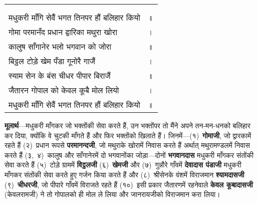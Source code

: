 
{
{\bfseries
\setlength{\mylenone}{0pt}
\settowidth{\mylentwo}{}
\setlength{\mylenone}{\maxof{\mylenone}{\mylentwo}}
\settowidth{\mylentwo}{मधुकरी माँगि सेवैं भगत तिनपर हौं बलिहार कियो}
\setlength{\mylenone}{\maxof{\mylenone}{\mylentwo}}
\settowidth{\mylentwo}{गोमा परमानँद प्रधान द्वारिका मथुरा खोरा}
\setlength{\mylenone}{\maxof{\mylenone}{\mylentwo}}
\settowidth{\mylentwo}{कालुष साँगानेर भलो भगवान को जोरा}
\setlength{\mylenone}{\maxof{\mylenone}{\mylentwo}}
\settowidth{\mylentwo}{बिट्ठल टोड़े खेम पँडा गूनोरै गाजैं}
\setlength{\mylenone}{\maxof{\mylenone}{\mylentwo}}
\settowidth{\mylentwo}{स्याम सेन के बंस चीधर पीपार बिराजैं}
\setlength{\mylenone}{\maxof{\mylenone}{\mylentwo}}
\settowidth{\mylentwo}{जैतारन गोपाल को केवल कूबै मोल लियो}
\setlength{\mylenone}{\maxof{\mylenone}{\mylentwo}}
\settowidth{\mylentwo}{मधुकरी माँगि सेवैं भगत तिनपर हौं बलिहार कियो}
\setlength{\mylenone}{\maxof{\mylenone}{\mylentwo}}
\setlength{\mylentwo}{\baselineskip}
\setlength{\mylenone}{\mylenone + 1pt}
\begin{longtable}[l]{@{\hspace*{\mylen}}>{\setlength\parfillskip{0pt}}p{\mylenone}@{}@{}l@{}}
 & \\[-\the\mylentwo]
\centering{॥ १४९ \hspace*{-1.5mm}॥} & \\ \nopagebreak
मधुकरी माँगि सेवैं भगत तिनपर हौं बलिहार कियो & ॥\\
गोमा परमानँद प्रधान द्वारिका मथुरा खोरा & ।\\ \nopagebreak
कालुष साँगानेर भलो भगवान को जोरा & ॥\\
बिट्ठल टोड़े खेम पँडा गूनोरै गाजैं & ।\\ \nopagebreak
स्याम सेन के बंस चीधर पीपार बिराजैं & ॥\\
जैतारन गोपाल को केवल कूबै मोल लियो & ।\\ \nopagebreak
मधुकरी माँगि सेवैं भगत तिनपर हौं बलिहार कियो & ॥
\end{longtable}
}
}
\begin{sloppypar}\justifying{}
\textbf{मूलार्थ}—मधुकरी माँगकर जो भक्तोंकी सेवा करते हैं, उन भक्तोंपर तो मैंने अपने तन-मन-धनको बलिहार कर दिया, क्योंकि वे चुटकी माँगते हैं और फिर भक्तोंको खिलाते हैं। जिनमें—(१)~\textbf{गोमाजी}, जो द्वारकामें रहते हैं (२)~प्रधान रूपसे \textbf{परमानन्दजी}, जो मथुराके खोरामें निवास करते हैं अर्थात् मथुरामण्डलमें निवास करते हैं (३,~४)~कालुष और साँगानेरमें दो भगवानोंका जोड़ा—दोनों \textbf{भगवानदास} मधुकरी माँगकर संतोंकी सेवा करते हैं (५)~टोड़े ग्राममें \textbf{विट्ठलजी} (६)~\textbf{खेमजी} और (७)~गुन्नौरे गाँवमें \textbf{देवादास पंडाजी} मधुकरी माँगकर संतोंकी सेवा करते हुए गर्जन किया करते हैं और (८)~श्रीसेनके वंशमें विराजमान \textbf{श्यामदासजी} (९)~\textbf{चीधरजी}, जो पीपारे गाँवमें विराजते रहते हैं (१०)~इसी प्रकार जैतारणमें रहनेवाले \textbf{केवल कूबादासजी} (केवलरामजी) ने तो गोपालको ही मोल ले लिया और जानरायजीको विराजमान करा लिया।
\end{sloppypar}
